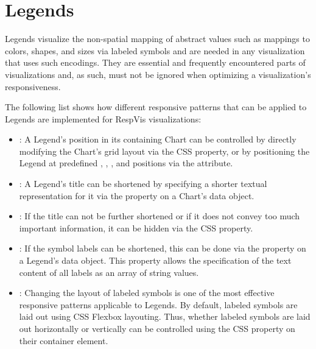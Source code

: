 \section{Legends}
\label{sec:LegendsUsage}

Legends visualize the non-spatial mapping of abstract values such as
mappings to colors, shapes, and sizes via labeled symbols and are
needed in any visualization that uses such encodings.  They are
essential and frequently encountered parts of visualizations and, as
such, must not be ignored when optimizing a visualization's
responsiveness.

The following list shows how different responsive patterns that can be
applied to Legends are implemented for RespVis visualizations:
\begin{itemize}
\item {}: A Legend's position in its containing
  Chart can be controlled by directly modifying the Chart's grid
  layout via the CSS  property, or by positioning
  the Legend at predefined , ,
  , and  positions via the
   attribute.

\item {}: A Legend's title can be shortened by
  specifying a shorter textual representation for it via the
   property on a Chart's data object.

\item {}: If the title can not be further
  shortened or if it does not convey too much important information,
  it can be hidden via the CSS  property.

\item {}: If the symbol labels can be
  shortened, this can be done via the  property on a
  Legend's data object.  This property allows the specification of the
  text content of all labels as an array of string values.

\item {}: Changing the layout of
  labeled symbols is one of the most effective responsive patterns
  applicable to Legends.  By default, labeled symbols are laid out
  using CSS Flexbox layouting.  Thus, whether labeled symbols are laid
  out horizontally or vertically can be controlled using the CSS
   property on their container element.

\end{itemize}





